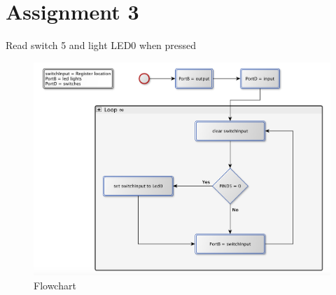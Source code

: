 \documentclass[a4paper, 12pt]{article}
\begin{document}
\section{Assignment 3}
\begin{algorithm}
\begin{algorithmic}
\Repeat
{} 
\EndIf
{}
\Until{$\infty$}
\EndProcedure
\caption{Read switch 5 and light LED0 when pressed}
\label{assign2.pseudo}
\end{algorithmic}
\end{algorithm}

\begin{figure}[h]
\includegraphics[scale=0.5]{Flowchart_pics/assignment3_pic.png} 
\caption{Flowchart}
\label{}
\end{figure}
\newpage
\end{document}
